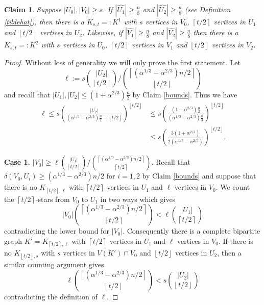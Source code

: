 \documentclass[oneside,12pt]{memoir}
\newtheorem{claim}[theorem]{Claim}
\newcommand{\floor}[1]{\left\lfloor#1\right\rfloor}
\newcommand{\ceiling}[1]{\left\lceil#1\right\rceil}
\begin{document}
\begin{claim}\label{K_1}
Suppose $|U_0|,|V_0|\geq s$.  If $|\hat{U_1}|\geq\frac{n}{8}$ and $|\hat{U_2}|\geq\frac{n}{8}$ (see Definition \ref{tildehat}), then there is a $K_{s,t}=:K^1$ with $s$ vertices in $V_0$, $\ceiling{t/2}$ vertices in $U_1$ and $\floor{t/2}$ vertices in $U_2$.  Likewise, if $|\hat{V_1}|\geq\frac{n}{8}$ and $|\hat{V_2}|\geq\frac{n}{8}$ then there is a $K_{s,t}=:K^2$ with $s$ vertices in $U_0$, $\ceiling{t/2}$ vertices in $V_1$ and $\floor{t/2}$ vertices in $V_2$.
\end{claim}


\begin{proof}

Without loss of generality we will only prove the first statement.  Let $$\ell:=s\binom{|U_2|}{\floor{t/2}}/\binom{\ceiling{(\alpha^{1/3}-\alpha^{2/3})n/2}}{\floor{t/2}}$$
and recall that $|U_1|, |U_2|\leq (1+\alpha^{2/3})\frac{n}{2}$ by Claim \ref{bounds}. Thus we have
\begin{align*}
\ell\leq s\left(\frac{|U_2|}{(\alpha^{1/3}-\alpha^{2/3})\frac{n}{2}-\floor{t/2}}\right)^{\floor{t/2}}&\leq  s\left(\frac{(1+\alpha^{2/3})\frac{n}{2}}{(\alpha^{1/3}-\alpha^{2/3})\frac{n}{3}}\right)^{\floor{t/2}}\\
&\leq s\left(\frac{3(1+\alpha^{2/3})}{2(\alpha^{1/3}-\alpha^{2/3})}\right)^{\floor{t/2}}  .\end{align*}

\noindent
\textbf{Case 1. } $|V_0|\geq  \ell \binom{|U_1|}{\ceiling{t/2}}/\binom{\ceiling{(\alpha^{1/3}-\alpha^{2/3})n/2}}{\ceiling{t/2}}$.
Recall that $\delta(V_0, U_i) \geq (\alpha^{1/3} - \alpha^{2/3})n/2$ for $i=1,2$ by Claim \ref{bounds} and suppose that there is no $K_{\ceiling{t/2},\ell}$ with $\ceiling{t/2}$ vertices in $U_1$ and $\ell$ vertices in $V_0$.  We count the $\ceiling{t/2}$-stars from $V_0$ to $U_1$ in two ways which gives $$|V_0| \binom{\ceiling{(\alpha^{1/3} - \alpha^{2/3})n/2}}{\ceiling{t/2}} < \ell \binom{|U_1|}{\ceiling{t/2}}$$
contradicting the lower bound for $|V_0|$. Consequently there is a complete bipartite graph $K'=K_{\ceiling{t/2},\ell}$ with $\ceiling{t/2}$ vertices in $U_1$ and $\ell$ vertices in $V_0$. If there is no $K_{\floor{t/2},s}$ with $s$ vertices in $V(K') \cap V_0$ and $\floor{t/2}$ vertices in $U_2$, then a similar counting argument gives $$\ell \binom{\ceiling{(\alpha^{1/3} - \alpha^{2/3})n/2}}{\floor{t/2}} < s\binom{|U_2|}{\floor{t/2}}$$
contradicting the definition of $\ell$.


\end{proof}
\end{document}
